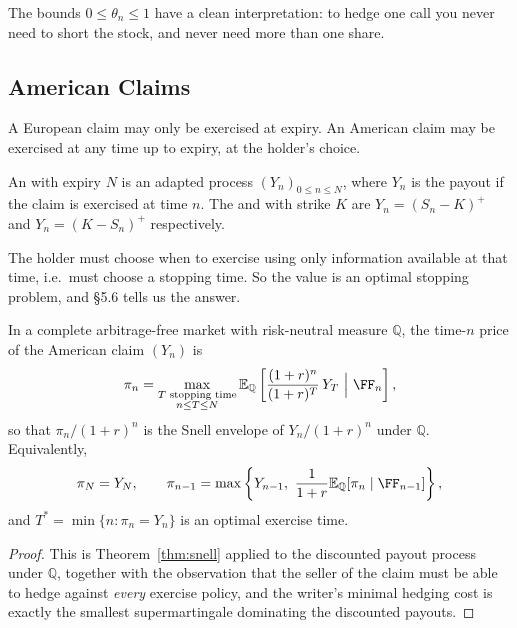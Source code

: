 \documentclass[a4paper]{scrartcl}
\newcommand{\QQ}{\mathbb{Q}}
\begin{document}
The bounds $0 \leq \theta_n \leq 1$ have a clean interpretation: to hedge one call you never need to short the stock, and never need more than one share.

\subsection{American Claims}

A European claim may only be exercised at expiry. An American claim may be exercised at any time up to expiry, at the holder's choice.

\begin{definition}
	An  with expiry $N$ is an adapted process $(Y_n)_{0\leq n\leq N}$, where $Y_n$ is the payout if the claim is exercised at time $n$. The  and  with strike $K$ are $Y_n = (S_n-K)^+$ and $Y_n = (K - S_n)^+$ respectively.
\end{definition}

The holder must choose when to exercise using only information available at that time, i.e.\ must choose a stopping time. So the value is an optimal stopping problem, and \S5.6 tells us the answer.

\begin{theorem}\label{thm:american-price}
	In a complete arbitrage-free market with risk-neutral measure $\QQ$, the time-$n$ price of the American claim $(Y_n)$ is
	$$
	\pi_n = \max_{\substack{T \text{ stopping time}\\ n \leq T \leq N}} \EE_\QQ\left[\frac{(1+r)^n}{(1+r)^{T}}\,Y_T\ \Big|\ \FF_n\right],
	$$
	so that $\pi_n/(1+r)^n$ is the Snell envelope of $Y_n/(1+r)^n$ under $\QQ$. Equivalently,
	$$
	\pi_N = Y_N, \qquad \pi_{n-1} = \max\left\{Y_{n-1},\ \frac{1}{1+r}\EE_\QQ[\pi_n\mid\FF_{n-1}]\right\},
	$$
	and $T^* = \min\{n : \pi_n = Y_n\}$ is an optimal exercise time.
\end{theorem}

\begin{proof}
	This is Theorem~\ref{thm:snell} applied to the discounted payout process under $\QQ$, together with the observation that the seller of the claim must be able to hedge against \emph{every} exercise policy, and the writer's minimal hedging cost is exactly the smallest supermartingale dominating the discounted payouts.
\end{proof}
\end{document}
